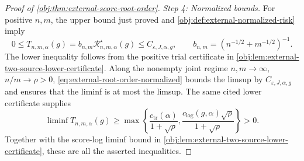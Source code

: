 \documentclass[11pt]{article}
\begin{document}
\begin{proof}[Proof of \cref{obj:thm:external-score-root-order}]
\emph{Step 4: Normalized bounds.}
For positive \(n,m\), the upper bound just proved and \cref{obj:def:external-normalized-risk} imply
\[
0\leq T_{n,m,\alpha}(g)
=b_{n,m}\mathcal R^\star_{n,m,\alpha}(g)
\leq C_{\varepsilon,J,\alpha,g},
\qquad
b_{n,m}=(n^{-1/2}+m^{-1/2})^{-1}. \label{eq:external-root-order-normalized}
\]
The lower inequality follows from the positive trial certificate in \cref{obj:lem:external-two-source-lower-certificate}. Along the nonempty joint regime \(n,m\to\infty\), \(n/m\to\rho>0\), \cref{eq:external-root-order-normalized} bounds the limsup by \(C_{\varepsilon,J,\alpha,g}\) and ensures that the liminf is at most the limsup. The same cited lower certificate supplies
\[
\liminf T_{n,m,\alpha}(g)\geq
\max\left\{
\frac{c_{\mathrm{tr}}(\alpha)}{1+\sqrt\rho},
\frac{c_{\mathrm{log}}(g,\alpha)\sqrt\rho}{1+\sqrt\rho}
\right\}>0.
\]
Together with the score-log liminf bound in \cref{obj:lem:external-two-source-lower-certificate}, these are all the asserted inequalities. %
\end{proof}




\end{document}
